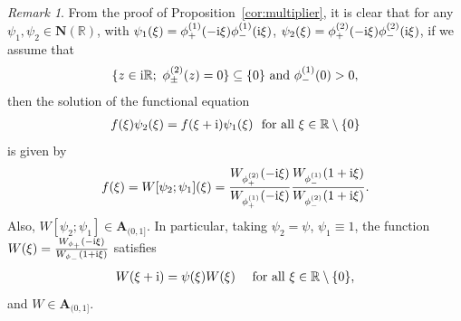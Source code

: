\documentclass[12pt]{amsart}
\newcommand{\hlabel}{\phantomsection\label}
\numberwithin{equation}{section}
\newcommand{\bb}{\mathbb}
\newcommand{\tb}{}
\newcommand{\A}{\mathbf{A}}
\theoremstyle{definition}
\theoremstyle{assump}
\theoremstyle{remark}
\newtheorem{rem}[thm]{Remark}
\begin{document}
\begin{rem}\hlabel{rem:fneq_rem}
From the proof of Proposition~\ref{cor:multiplier}, it is clear that for any $\psi_1,\psi_2\in\mathbf{N}(\bb{R})$, with $\psi_1(\xi)=\phi^{(1)}_+(-{\rm{i}}\xi  )\phi^{(1)}_-({\rm{i}}\xi  )$, $\psi_2(\xi)=\phi^{(2)}_+(-{\rm{i}}\xi  )\phi^{(2)}_-({\rm{i}}\xi  )$, if we assume that
$$ \{z\in {\rm{i}}\bb{R};  \ \phi^{(2)}_\pm(z)=0\}\subseteq\{0\} \text{ and } \phi^{(1)}_-(0)>0,$$ then the solution of the functional equation
\begin{align}
f(\xi)\psi_2(\xi)=f(\xi+{\rm{i}})   \psi_1(\xi) \  \mbox{ for all } \xi\in\bb{R}\setminus\{0\}
\end{align}
is given by $$f(\xi)=W[\psi_2;\psi_1](\xi)=\frac{W_{\phi^{(2)}_+}(-{\rm{i}}\xi  )}{W_{\phi^{(1)}_+}(-{\rm{i}}\xi  )}\frac{W_{\phi^{(1)}_-}(1+{\rm{i}}\xi  )}{W_{\phi^{(2)}_-}(1+{\rm{i}}\xi  )}. $$
Also, $W[\psi_2; \psi_1]\in\A_{(0,1]}$. In particular, taking $\psi_2=\psi$, $\psi_1\equiv 1$, the function $W(\xi)=\frac{W_{\phi_+}(-{\rm{i}}\xi  )}{W_{\phi_-}(1+{\rm{i}}\xi  )}$ satisfies
\begin{align}
W(\xi+{\rm{i}})   =\psi(\xi)W(\xi) \ \ \ \mbox{ for all } \xi\in\bb{R}\setminus\{0\},
\end{align}
and $W\in\A_{(0,1]}$. %
\end{rem}
\end{document}
